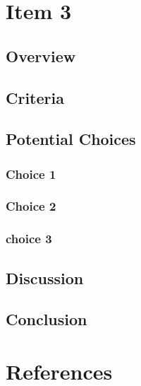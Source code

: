 \documentclass[letterpaper,10pt]{article}
\begin{document}
	
\section{Item 3}
		\subsection{Overview}
	
	\subsection{Criteria}
	
	\subsection{Potential Choices}
		\subsubsection{Choice 1}
		
		\subsubsection{Choice 2}
		
		\subsubsection{choice 3}
		
	\subsection{Discussion}
	
	\subsection{Conclusion}
	
\section{References}
\end{document}
